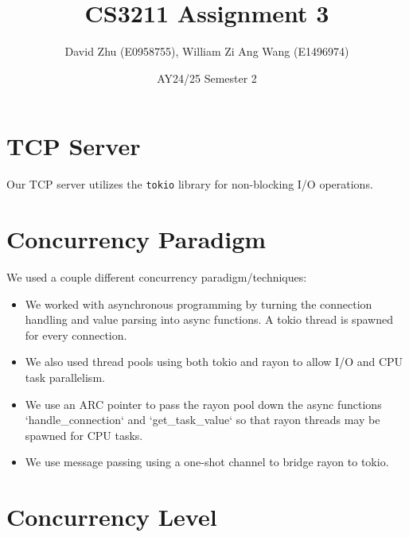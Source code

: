 \documentclass[11pt]{article}
\title{CS3211 Assignment 3}
\author{David Zhu (E0958755), William Zi Ang Wang (E1496974)}
\date{AY24/25 Semester 2}
\begin{document}
\maketitle


\section{TCP Server}

Our TCP server utilizes the \texttt{tokio} library for non-blocking I/O operations.

\section{Concurrency Paradigm}

We used a couple different concurrency paradigm/techniques:
\begin{itemize}
    \item We worked with asynchronous programming by turning the connection handling and value parsing into async functions. A tokio thread is spawned for every connection.
    \item We also used thread pools using both tokio and rayon to allow I/O and CPU task parallelism.
    \item We use an ARC pointer to pass the rayon pool down the async functions `handle_connection` and `get_task_value` so that rayon threads may be spawned for CPU tasks.
    \item We use message passing using a one-shot channel to bridge rayon to tokio.
\end{itemize}


\section{Concurrency Level}
\end{document}
